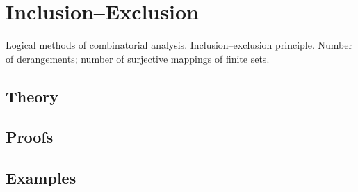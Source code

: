 
\section{Inclusion–Exclusion}
\label{sec:2.2.05-inclusion-exclusion}

\begin{ticket}
Logical methods of combinatorial analysis. Inclusion–exclusion principle. Number of derangements; number of surjective mappings of finite sets.
\end{ticket}

\subsection*{Theory}

\subsection*{Proofs}

\subsection*{Examples}
